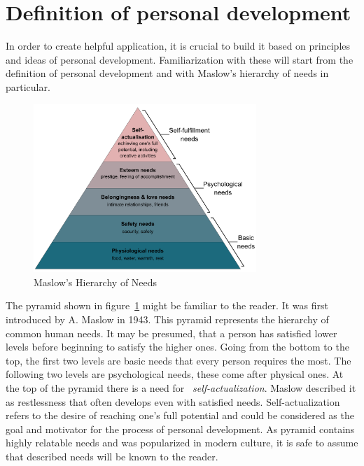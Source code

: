 
\section{Definition of personal development}\label{sec:definition-of-personal-development}

In order to create helpful application, it is crucial to build it based on principles and ideas of personal development.
Familiarization with these will start from the definition of personal development and with Maslow's hierarchy of needs in particular.

\begin{figure}[h]
    \includegraphics[width=0.75\textwidth]{images/maslows.png}
    \caption{Maslow's Hierarchy of Needs~\cite{maslow-pyramid}}
    \label{fig:maslow-pyramid}
\end{figure}

The pyramid shown in figure~\ref{fig:maslow-pyramid} might be familiar to the reader.
It was first introduced by A. Maslow in 1943.\cite{maslow-motivation}
This pyramid represents the hierarchy of common human needs.
It may be presumed, that a person has satisfied lower levels before beginning to satisfy the higher ones.
Going from the bottom to the top, the first two levels are basic needs that every person requires the most.
The following two levels are psychological needs, these come after physical ones.
At the top of the pyramid there is a need for ~\textit{self-actualization}.
Maslow described it as restlessness that often develops even with satisfied needs.
Self-actualization refers to the desire of reaching one's full potential and could be considered as the goal and motivator for the process of personal development.
As pyramid contains highly relatable needs and was popularized in modern culture, it is safe to assume that described needs will be known to the reader.

